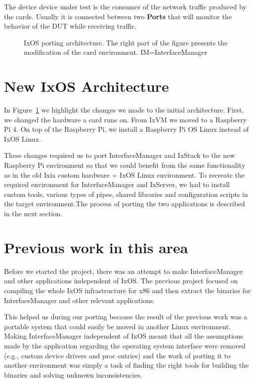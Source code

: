 The device device under test is the consumer of the network traffic produced by
the cards. Usually it is connected between two \textbf{Ports} that will monitor the
behavior of the DUT while receiving traffic.

\begin{figure}
    \centering
    \def\svgscale{0.95}
    
    \caption{IxOS porting architecture. The right part of the figure presents
    the modification of the card environment. \small{IM=InterfaceManager}}
    \label{fig:ixos_arch}
    \medskip
    \small
\end{figure}

\section{New IxOS Architecture}

In Figure~\ref{fig:ixos_arch} we highlight the changes we made to the initial
architecture. First, we changed the hardware a card runs on. From IxVM we moved
to a Raspberry Pi 4. On top of the Raspberry Pi, we install a Raspberry Pi OS Linux
instead of IxOS Linux.

These changes required us to port InterfaceManager and IxStack to the new
Raspberry Pi environment so that we could benefit from the same functionality as
in the old Ixia custom hardware + IxOS Linux environment. To recreate the
required environment for InterfaceManager and IxServer, we had to install custom tools,
various types of pipes, shared libraries and configuration scripts in the target
environment.The process of porting the two applications is described in the next
section.

\section{Previous work in this area}

Before we started the project, there was an attempt to make InterfaceManager
and other applications independent of IxOS. The previous project focused on
compiling the whole IxOS infrastructure for x86 and then extract the binaries
for InterfaceManager and other relevant applications.

This helped us during our porting because the result of the previous work was a
portable system that could easily be moved in another Linux environment.
Making InterfaceManager independent of IxOS meant that all the assumptions made
by the application regarding the operating system interface were removed (e.g.,
custom device drivers and proc entries) and the work of porting it to another
environment was simply a task of finding the right tools for building the
binaries and solving unknown inconsistencies.

